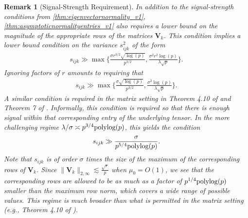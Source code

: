 \documentclass[10pt]{article}
\newcommand{\0}{{\mathbf{0}}}
\newcommand{\1}{{\mathbf{1}}}
\newcommand{\polylog}{{\rm polylog}}
\renewcommand{\citet}{\cite}
\newtheorem{remark}{Remark}
\renewcommand{\hat}{\widehat}
\renewcommand{\hat}{\widehat}
\begin{document}


\begin{remark}[Signal-Strength Requirement] In addition to the signal-strength conditions from \cref{thm:eigenvectornormality_v1}, \cref{thm:asymptoticnormalityentries_v1} also requires a lower bound on the magnitude of the appropriate rows of the matrices $\mathbf{V}_k$. This condition implies a lower bound condition on the variance $s^2_{ijk}$ of the form
\begin{align*}
    s_{ijk} \gg \max\bigg\{ \frac{\sigma r^{3/2} \sqrt{\log(p)}}{p^{3/2}}, \frac{\sigma^2 r^2 \log(p)}{\lambda \sqrt{p}} \bigg\}.
\end{align*}
Ignoring factors of $r$ amounts to requiring that 
\begin{align*}
     s_{ijk} \gg \max\bigg\{ \frac{\sigma\sqrt{\log(p)}}{p^{3/2}}, \frac{\sigma^2 \log(p)}{\lambda \sqrt{p}} \bigg\}.
\end{align*}
A similar condition is required in the matrix setting in Theorem 4.10 of \cite{chen_spectral_2021} and Theorem 7 of \cite{yan_inference_2021}. Informally, this condition is required so that there is enough signal within that corresponding entry of the underlying tensor. In the more challenging regime $\lambda/\sigma \asymp p^{3/4}\polylog(p)$, this yields the condition
\begin{align*}
    s_{ijk} \gg \frac{\sigma}{p^{5/4} \polylog(p)}.
\end{align*}
Note that $s_{ijk}$ is of order $\sigma$ times the size of the maximum of the corresponding rows of $\mathbf{V}_k$.  Since $\| \mathbf{V}_k \|_{2,\infty} \lesssim  \frac{\sqrt{r}}{p}$ when $\mu_0 = O(1)$, we see that the corresponding rows are allowed to be as much as a factor of $p^{1/4} \polylog(p)$ smaller than the maximum row norm, which covers a wide range of possible values.  This regime is much broader than what is permitted in the matrix setting (e.g., Theorem 4.10 of \citet{chen_spectral_2021}). %
\end{remark}
\end{document}
